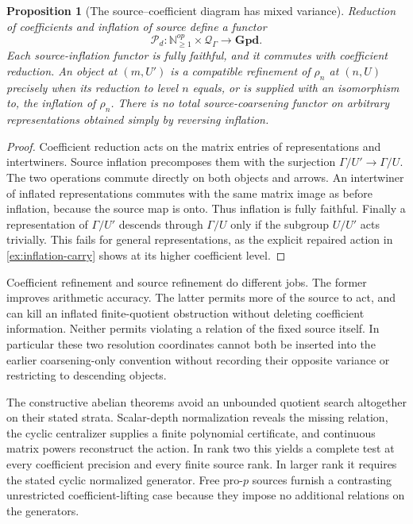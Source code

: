 \documentclass[11pt]{article}
\newtheorem{proposition}[theorem]{Proposition}
\theoremstyle{definition}
\theoremstyle{remark}
\begin{document}
\begin{proposition}[The source--coefficient diagram has mixed variance]\label{prop:mixed-source-variance}
Reduction of coefficients and inflation of source define a functor
\[
 \mathscr P_d:\mathbb N_{\geq1}^{op}\times\mathcal Q_\Gamma
 \longrightarrow\mathbf{Gpd}.
\]
Each source-inflation functor is fully faithful, and it commutes with coefficient reduction. An object at $(m,U')$ is a compatible refinement of $\rho_n$ at $(n,U)$ precisely when its reduction to level $n$ equals, or is supplied with an isomorphism to, the inflation of $\rho_n$. There is no total source-coarsening functor on arbitrary representations obtained simply by reversing inflation.
\end{proposition}
\begin{proof}
Coefficient reduction acts on the matrix entries of representations and intertwiners. Source inflation precomposes them with the surjection $\Gamma/U'\to\Gamma/U$. The two operations commute directly on both objects and arrows. An intertwiner of inflated representations commutes with the same matrix image as before inflation, because the source map is onto. Thus inflation is fully faithful. Finally a representation of $\Gamma/U'$ descends through $\Gamma/U$ only if the subgroup $U/U'$ acts trivially. This fails for general representations, as the explicit repaired action in \cref{ex:inflation-carry} shows at its higher coefficient level.
\end{proof}

Coefficient refinement and source refinement do different jobs. The former improves arithmetic accuracy. The latter permits more of the source to act, and can kill an inflated finite-quotient obstruction without deleting coefficient information. Neither permits violating a relation of the fixed source itself. In particular these two resolution coordinates cannot both be inserted into the earlier coarsening-only convention without recording their opposite variance or restricting to descending objects.

The constructive abelian theorems avoid an unbounded quotient search altogether on their stated strata. Scalar-depth normalization reveals the missing relation, the cyclic centralizer supplies a finite polynomial certificate, and continuous matrix powers reconstruct the action. In rank two this yields a complete test at every coefficient precision and every finite source rank. In larger rank it requires the stated cyclic normalized generator. Free pro-$p$ sources furnish a contrasting unrestricted coefficient-lifting case because they impose no additional relations on the generators.
\end{document}
